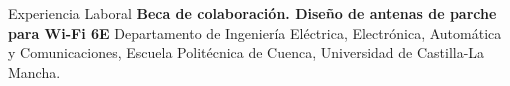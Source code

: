 \begin{rubric}{Experiencia Laboral}
%
%
	\textbf{Beca de colaboración. Diseño de antenas de parche para Wi-Fi 6E} Departamento de Ingeniería Eléctrica, Electrónica, Automática y Comunicaciones, Escuela Politécnica de Cuenca, Universidad de Castilla-La Mancha.
%
\end{rubric}
